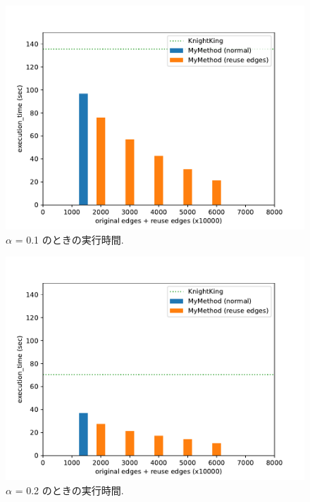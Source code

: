 \begin{figure}[t]
    \centering
    \includegraphics[scale=0.8]{figure/AR_cache_alpha_0.1.pdf}
    \caption{$\alpha$ = 0.1 のときの実行時間.}
    \label{alpha = 0.1 のときの実行時間}
\end{figure}

\begin{figure}[t!]
    \centering
    \includegraphics[scale=0.8]{figure/AR_cache_alpha_0.2.pdf}
    \caption{$\alpha$ = 0.2 のときの実行時間.}
    \label{alpha = 0.2 のときの実行時間}
\end{figure}

